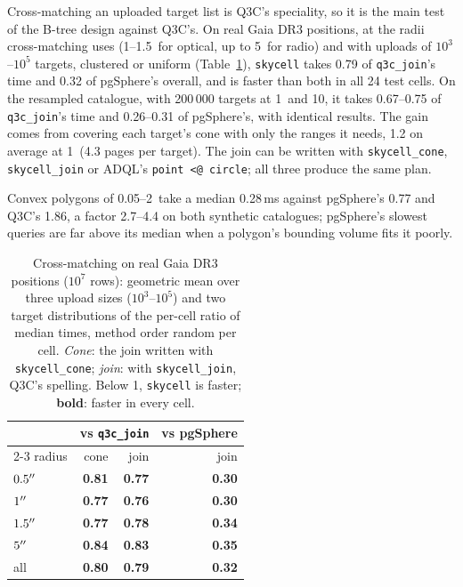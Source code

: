 Cross-matching an uploaded target list is Q3C's speciality, so it is the main test of
the B-tree design against Q3C's. On real Gaia DR3 positions, at the radii cross-matching
uses (1--1.5\arcsec\ for optical, up to 5\arcsec\ for radio) and with uploads of
$10^3$--$10^5$ targets, clustered or uniform (Table~\ref{tab:xmreal}), \texttt{skycell}
takes 0.79 of \texttt{q3c\_join}'s time and 0.32 of pgSphere's overall, and is faster
than both in all 24 test cells. On the resampled catalogue, with 200\,000 targets at
1\arcsec\ and 10\arcsec, it takes 0.67--0.75 of \texttt{q3c\_join}'s time and
0.26--0.31 of pgSphere's, with identical results. The gain comes from covering each
target's cone with only the ranges it needs, 1.2 on average at 1\arcsec\ (4.3 pages per
target). The join can be written with \texttt{skycell\_cone}, \texttt{skycell\_join} or
ADQL's \texttt{point <@ circle}; all three produce the same plan.

Convex polygons of 0.05\degr--2\degr\ take a median 0.28\,ms against pgSphere's 0.77 and
Q3C's 1.86, a factor 2.7--4.4 on both synthetic catalogues; pgSphere's slowest queries
are far above its median when a polygon's bounding volume fits it poorly.

\begin{table}
  \caption{Cross-matching on real Gaia DR3 positions ($10^7$ rows): geometric mean over
    three upload sizes ($10^3$--$10^5$) and two target distributions of the per-cell
    ratio of median times, method order random per cell. \emph{Cone}: the join written
    with \texttt{skycell\_cone}; \emph{join}: with \texttt{skycell\_join}, Q3C's
    spelling. Below 1, \texttt{skycell} is faster; \textbf{bold}: faster in every cell.}
  \label{tab:xmreal}
  \centering
  \footnotesize
  \begin{tabular}{l rr r}
    \hline\hline
    & \multicolumn{2}{c}{vs \texttt{q3c\_join}} & vs pgSphere \\
    \cline{2-3}\cline{4-4}
    radius & cone & join & join \\
    \hline
    $0.5^{\prime\prime}$ & \textbf{0.81} & \textbf{0.77} & \textbf{0.30} \\
    $1^{\prime\prime}$   & \textbf{0.77} & \textbf{0.76} & \textbf{0.30} \\
    $1.5^{\prime\prime}$ & \textbf{0.77} & \textbf{0.78} & \textbf{0.34} \\
    $5^{\prime\prime}$   & \textbf{0.84} & \textbf{0.83} & \textbf{0.35} \\
    \hline
    all          & \textbf{0.80} & \textbf{0.79} & \textbf{0.32} \\
    \hline
  \end{tabular}
\end{table}

